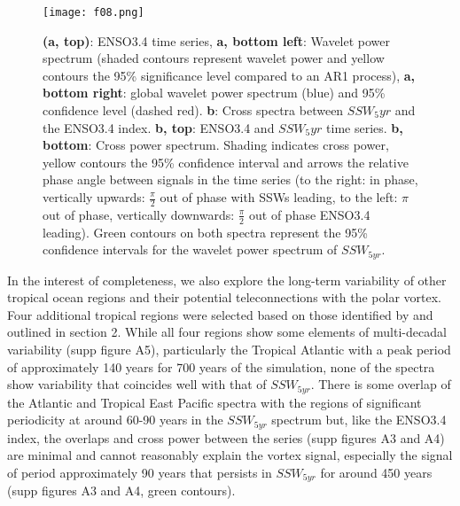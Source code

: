 \documentclass[wcd, manuscript]{copernicus}
\begin{document}
\begin{center}
\begin{figure}[h!]
\noindent\texttt{[image: f08.png]}
\caption{\textbf{(a, top)}: ENSO3.4 time series, \textbf{a, bottom left}: Wavelet power spectrum (shaded contours represent wavelet power and yellow contours the 95\% significance level compared to an AR1 process), \textbf{a, bottom right}: global wavelet power spectrum (blue) and 95\% confidence level (dashed red). \textbf{b}: Cross spectra between $SSW_5yr$ and the ENSO3.4 index. \textbf{b, top}: ENSO3.4 and $SSW_5yr$ time series. \textbf{b, bottom}: Cross power spectrum. Shading indicates cross power, yellow contours the 95\% confidence interval and arrows the relative phase angle between signals in the time series (to the right: in phase, vertically upwards: $\frac{\pi}{2}$ out of phase with SSWs leading, to the left: $\pi$ out of phase, vertically downwards: $\frac{\pi}{2}$ out of phase ENSO3.4 leading). Green contours on both spectra represent the 95\% confidence intervals for the wavelet power spectrum of $SSW_{5yr}$.}
\end{figure}
\end{center}

In the interest of completeness, we also explore the long-term variability of other tropical ocean regions and their potential teleconnections with the polar vortex. Four additional tropical regions were selected based on those identified by \cite{Scaife2016} and outlined in section 2. While all four regions show some elements of multi-decadal variability (supp figure A5), particularly the Tropical Atlantic with a peak period of approximately 140 years for 700 years of the simulation, none of the spectra show variability that coincides well with that of $SSW_{5yr}$. There is some overlap of the Atlantic and Tropical East Pacific spectra with the regions of significant periodicity at around 60-90 years in the $SSW_{5yr}$ spectrum but, like the ENSO3.4 index, the overlaps and cross power between the series (supp figures A3 and A4) are minimal and cannot reasonably explain the vortex signal, especially the signal of period approximately 90 years that persists in $SSW_{5yr}$ for around 450 years (supp figures A3 and A4, green contours).
\end{document}
